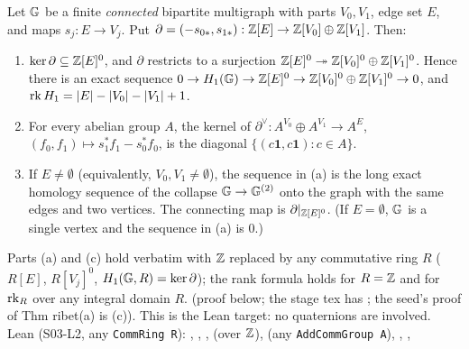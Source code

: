 \begin{lemma}\label{lem:s03-bip}
Let $\mathbb{G}$ be a finite \emph{connected} bipartite multigraph with parts $V_0,V_1$, edge set $E$, and maps $s_j:E\to V_j$. Put
$\partial=(-s_{0*},s_{1*}):\mathbb{Z}[E]\to\mathbb{Z}[V_0]\oplus\mathbb{Z}[V_1]$. Then:
\begin{enumerate}[label=(\alph*)]
\item $\ker\partial\subseteq\mathbb{Z}[E]^0$, and $\partial$ restricts to a surjection $\mathbb{Z}[E]^0\twoheadrightarrow\mathbb{Z}[V_0]^0\oplus\mathbb{Z}[V_1]^0$.
  Hence there is an exact sequence $0\to H_1(\mathbb{G})\to\mathbb{Z}[E]^0\to\mathbb{Z}[V_0]^0\oplus\mathbb{Z}[V_1]^0\to0$, and $\operatorname{rk} H_1=|E|-|V_0|-|V_1|+1$.
\item For every abelian group $A$, the kernel of $\partial^\vee:A^{V_0}\oplus A^{V_1}\to A^E$, $(f_0,f_1)\mapsto s_1^*f_1-s_0^*f_0$, is
  the diagonal $\{(c\mathbf1,c\mathbf1):c\in A\}$.
\item If $E\ne\emptyset$ (equivalently, $V_0,V_1\ne\emptyset$), the sequence in (a) is the long exact homology sequence of the collapse
  $\mathbb{G}\to\mathbb{G}^{(2)}$ onto the graph with the same edges and two vertices. The connecting map is $\partial|_{\mathbb{Z}[E]^0}$. (If $E=\emptyset$, $\mathbb{G}$ is a
  single vertex and the sequence in (a) is $0$.)
\end{enumerate}
Parts (a) and (c) hold verbatim with $\mathbb{Z}$ replaced by any commutative ring $R$ ($R[E]$, $R[V_j]^0$, $H_1(\mathbb{G},R)=\ker\partial$); the rank formula holds
for $R=\mathbb{Z}$ and for $\operatorname{rk}_R$ over any integral domain $R$. \stproved{} (proof below; the stage tex has \sttoprove; the seed's proof of Thm ribet(a)
is (c)). This is the Lean target: no quaternions are involved. Lean (S03-L2, any \texttt{CommRing R}): , , ,  (over $\mathbb{Z}$),  (any \texttt{AddCommGroup A}), , ,  \stformal{}
\end{lemma}
